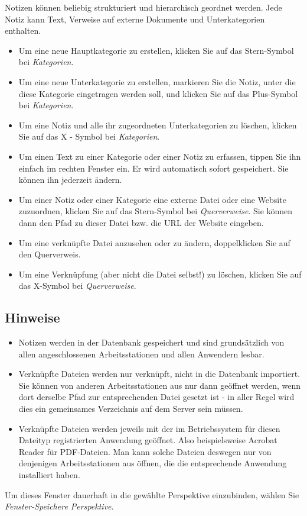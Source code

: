 Notizen können beliebig strukturiert und hierarchisch geordnet werden. Jede Notiz kann Text,
 Verweise auf externe Dokumente und Unterkategorien enthalten.

\begin{itemize}
 \item Um eine neue Hauptkategorie zu erstellen, klicken Sie auf das Stern-Symbol bei \textit{Kategorien}.
\item Um eine neue Unterkategorie zu erstellen, markieren Sie die Notiz, unter die diese Kategorie eingetragen werden soll, und klicken Sie auf das Plus-Symbol bei \textit{Kategorien}.
\item Um eine Notiz und alle ihr zugeordneten Unterkategorien zu löschen, klicken Sie auf das X - Symbol bei \textit{Kategorien}.
\item Um einen Text zu einer Kategorie oder einer Notiz zu erfassen, tippen Sie ihn einfach im rechten Fenster ein. Er wird automatisch sofort gespeichert. Sie können ihn jederzeit ändern.
\item Um einer Notiz oder einer Kategorie eine externe Datei oder eine Website zuzuordnen, klicken Sie auf das Stern-Symbol bei \textit{Querverweise}. Sie können dann den Pfad zu dieser Datei bzw. die URL der Website eingeben.
\item Um eine verknüpfte Datei anzusehen oder zu ändern, doppelklicken Sie auf den Querverweis.
\item Um eine Verknüpfung (aber nicht die Datei selbst!) zu löschen, klicken Sie auf das X-Symbol bei \textit{Querverweise}.
\end{itemize}

\subsection{Hinweise}

\begin{itemize}
 \item Notizen werden in der Datenbank gespeichert und sind grundsätzlich von allen angeschlossenen Arbeitsstationen und allen Anwendern lesbar.
\item Verknüpfte Dateien werden nur verknüpft, nicht in die Datenbank importiert. Sie können von anderen Arbeitsstationen aus nur dann geöffnet werden, wenn dort derselbe Pfad zur entsprechenden Datei gesetzt ist - in aller Regel wird dies ein gemeinsames Verzeichnis auf dem Server sein müssen.
\item Verknüpfte Dateien werden jeweils mit der im Betriebssystem für diesen Dateityp registrierten Anwendung geöffnet. Also beispielsweise Acrobat Reader für PDF-Dateien. Man kann solche Dateien deswegen nur von denjenigen Arbeitsstationen aus öffnen, die die entsprechende Anwendung installiert haben.
\end{itemize}

Um dieses Fenster dauerhaft in die gewählte Perspektive einzubinden, wählen
Sie \textit{Fenster-Speichere Perspektive}.

